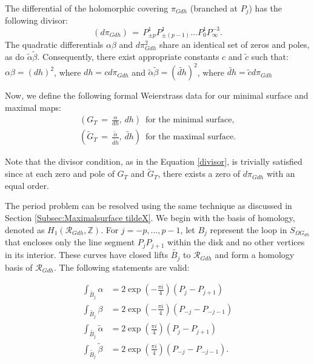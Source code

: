 \documentclass[12pt,epsfig,tikz,multi]{amsart}
\numberwithin{equation}{section}
\begin{document}
The differential of the holomorphic covering $\pi_{Gdh}$ (branched at $P_j$) has the following 
divisor:
\begin{equation*}
    (d\pi_{Gdh}) \,=\, P_{\pm p}^1P_{\pm (p-1)}^1 \ldots P_0^1 P_{\infty}^{-3}.
\end{equation*}
The quadratic differentials $\alpha \beta$ and $d\pi_{Gdh}^2$ share an identical set of zeros and poles, as do $\widetilde{\alpha}\widetilde{\beta}$. Consequently, there exist appropriate constants $c$ and $\widetilde{c}$ such that: 
$\alpha\beta = (dh)^2$, where $dh = cd\pi_{Gdh}$ and 
$\widetilde{\alpha}\widetilde{\beta} = (\widetilde{dh})^2$, where $\widetilde{dh} = \widetilde{c}d\pi_{Gdh}$


Now, we define the following formal Weierstrass data for our minimal surface and maximal maps:
\begin{align*}
    \left(G_T \,=\, \frac{\alpha}{dh},\, dh\right)\, \text{ for the minimal surface,}\\
   \left(\widetilde{G}_T \,=\, \frac{\widetilde\alpha}{\widetilde{dh}},\, \widetilde{dh}\right)\, \text{ for the maximal surface}.
\end{align*}

Note that the divisor condition, as in the Equation \ref{divisor}, is trivially satisfied since at each zero and pole of $G_T$ and $\widetilde{G}_T$, there exists a zero of $d\pi_{Gdh}$ with an equal order.

The period problem can be resolved using the same technique as discussed in Section \ref{Subsec:Maximalsurface tildeX}. We begin with the basis of homology, denoted as $H_1(\mathcal{R}_{{Gdh}}, \mathbb Z)$.   For $j = -p, \ldots, p - 1$, let $B_j$ represent the loop in $S_{\Omega G_{dh}}$ that encloses only the line segment $P_jP_{j+1}$ within the disk and no other vertices in its interior.  These curves have closed lifts $\widetilde{B_j}$ to $\mathcal{R}_{Gdh}$ and form a homology basis of $\mathcal{R}_{Gdh}$. The following statements are valid:


\begin{align*}
    \int_{\widetilde{B_j}}\alpha &= 2\exp\left(-\frac{\pi i}{4}\right)(P_j-P_{j+1}) \\
    \int_{\widetilde{B_j}}\beta &= 2\exp\left(-\frac{\pi i}{4}\right)(P_{-j}-P_{-j-1}) \\
    \int_{\widetilde{B_j}}\widetilde\alpha &= 2\exp\left(\frac{\pi i}{4}\right)(P_j-P_{j+1}) \\
    \int_{\widetilde{B_j}}\widetilde\beta &= 2\exp\left(\frac{\pi i}{4}\right)(P_{-j}-P_{-j-1}).
\end{align*}
\end{document}
